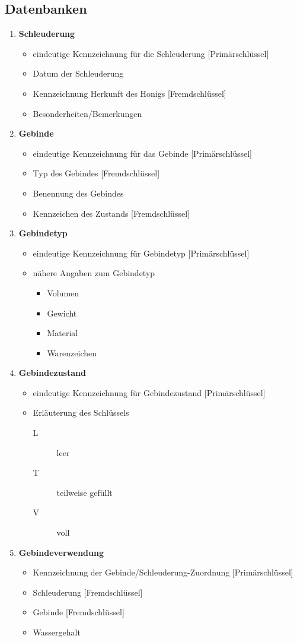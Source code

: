 \subsection{Datenbanken} 
\begin{enumerate}
\item \label{DBschl}  \textbf{Schleuderung}
\begin{itemize}
\item eindeutige Kennzeichnung für die Schleuderung [Primärschlüssel]
\item Datum der Schleuderung
\item Kennzeichnung Herkunft des Honigs [Fremdschlüssel]
\item Besonderheiten/Bemerkungen
\end{itemize}
\item \textbf{Gebinde}\label{DBgeb}
\begin{itemize}
\item eindeutige Kennzeichnung für das Gebinde [Primärschlüssel]
\item Typ des Gebindes [Fremdschlüssel]
\item Benennung des Gebindes 
\item Kennzeichen des Zustands [Fremdschlüssel]
\end{itemize}
\item \textbf{Gebindetyp}\label{DBgebt}
\begin{itemize}
\item eindeutige Kennzeichnung für Gebindetyp [Primärschlüssel]
\item nähere Angaben zum Gebindetyp
\begin{itemize}
\item Volumen
\item Gewicht
\item Material
\item Warenzeichen
\end{itemize}
\end{itemize}
\item \textbf{Gebindezustand}\label{DBgebz}
\begin{itemize}
\item eindeutige Kennzeichnung für Gebindezustand [Primärschlüssel]
\item Erläuterung des Schlüssels
\begin{description}
\item[L] leer
\item[T] teilweise gefüllt
\item[V] voll
\end{description}
\end{itemize}
\item \textbf{Gebindeverwendung}\label{DBgebv}
\begin{itemize}
\item Kennzeichnung der Gebinde/Schleuderung-Zuordnung [Primärschlüssel]
\item Schleuderung [Fremdschlüssel]
\item Gebinde [Fremdschlüssel]
\item Wassergehalt
\end{itemize}
\end{enumerate}
